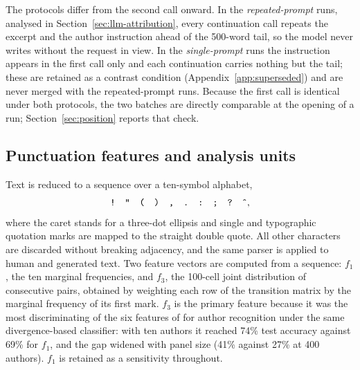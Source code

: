 \documentclass[11pt]{article}
\newcommand{\fOne}{\ensuremath{f_1}\xspace}
\newcommand{\fThree}{\ensuremath{f_3}\xspace}
\begin{document}
The protocols differ from the second call onward.  In the
\emph{repeated-prompt} runs, analysed in
Section~\ref{sec:llm-attribution}, every continuation call repeats the
excerpt and the author instruction ahead of the 500-word tail, so the
model never writes without the request in view.  In the
\emph{single-prompt} runs the instruction appears in the first call only
and each continuation carries nothing but the tail; these are retained as
a contrast condition (Appendix~\ref{app:superseded}) and are never merged
with the repeated-prompt runs.  Because the first call is identical under
both protocols, the two batches are directly comparable at the opening of
a run; Section~\ref{sec:position} reports that check.

\subsection{Punctuation features and analysis units}
\label{sec:representation}

Text is reduced to a sequence over a ten-symbol alphabet,
\[
  \texttt{!}\quad\texttt{"}\quad\texttt{(}\quad\texttt{)}\quad\texttt{,}
  \quad\texttt{.}\quad\texttt{:}\quad\texttt{;}\quad\texttt{?}\quad\texttt{\^{}},
\]
where the caret stands for a three-dot ellipsis and single and typographic
quotation marks are mapped to the straight double quote.  All other
characters are discarded without breaking adjacency, and the same parser is
applied to human and generated text.  Two feature vectors are computed from
a sequence: \fOne, the ten marginal frequencies, and \fThree, the 100-cell
joint distribution of consecutive pairs, obtained by weighting each row of
the transition matrix by the marginal frequency of its first mark.
\fThree is the primary feature because it was the most discriminating of
the six features of \cite{darmon2021} for author recognition under the
same divergence-based classifier: with ten authors it reached 74\% test
accuracy against 69\% for \fOne, and the gap widened with panel size (41\%
against 27\% at 400 authors).  \fOne is retained as a sensitivity
throughout.

\label{sec:units}
\end{document}
